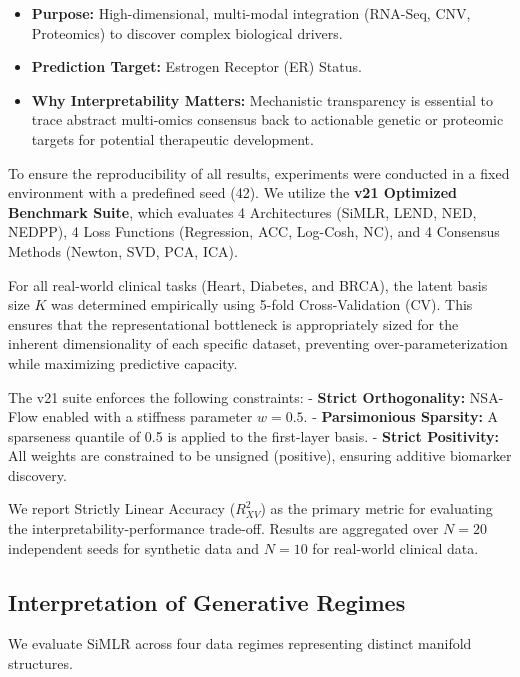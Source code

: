 \documentclass[
  letterpaper,
]{report}
\providecommand{\tightlist}{%
  \setlength{\itemsep}{0pt}\setlength{\parskip}{0pt}}
\begin{document}
\begin{enumerate}
  \begin{itemize}
  \tightlist
  \item
    \textbf{Purpose:} High-dimensional, multi-modal integration
    (RNA-Seq, CNV, Proteomics) to discover complex biological drivers.
  \item
    \textbf{Prediction Target:} Estrogen Receptor (ER) Status.
  \item
    \textbf{Why Interpretability Matters:} Mechanistic transparency is
    essential to trace abstract multi-omics consensus back to actionable
    genetic or proteomic targets for potential therapeutic development.
  \end{itemize}
\end{enumerate}

To ensure the reproducibility of all results, experiments were conducted
in a fixed environment with a predefined seed (42). We utilize the
\textbf{v21 Optimized Benchmark Suite}, which evaluates 4 Architectures
(SiMLR, LEND, NED, NEDPP), 4 Loss Functions (Regression, ACC, Log-Cosh,
NC), and 4 Consensus Methods (Newton, SVD, PCA, ICA).

For all real-world clinical tasks (Heart, Diabetes, and BRCA), the
latent basis size \(K\) was determined empirically using 5-fold
Cross-Validation (CV). This ensures that the representational bottleneck
is appropriately sized for the inherent dimensionality of each specific
dataset, preventing over-parameterization while maximizing predictive
capacity.

The v21 suite enforces the following constraints: - \textbf{Strict
Orthogonality:} NSA-Flow enabled with a stiffness parameter \(w=0.5\). -
\textbf{Parsimonious Sparsity:} A sparseness quantile of 0.5 is applied
to the first-layer basis. - \textbf{Strict Positivity:} All weights are
constrained to be unsigned (positive), ensuring additive biomarker
discovery.

We report Strictly Linear Accuracy (\(R^2_{XV}\)) as the primary metric
for evaluating the interpretability-performance trade-off. Results are
aggregated over \(N=20\) independent seeds for synthetic data and
\(N=10\) for real-world clinical data.

\subsection{Interpretation of Generative
Regimes}\label{interpretation-of-generative-regimes}

We evaluate SiMLR across four data regimes representing distinct
manifold structures.
\end{document}
